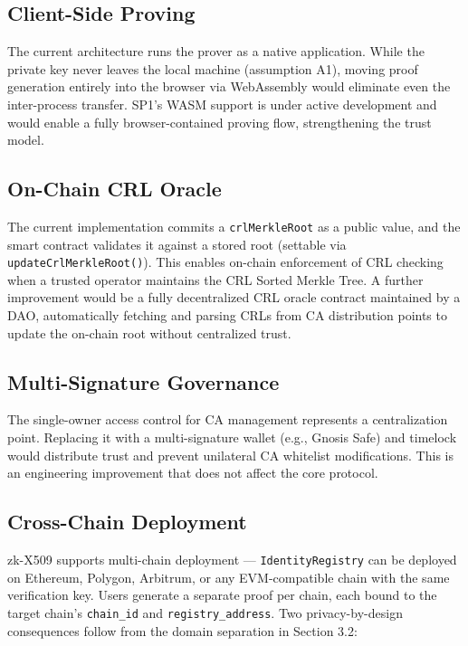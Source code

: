 \documentclass[11pt, a4paper]{article}
\begin{document}
\subsection{Client-Side Proving}\label{client-side-proving}

The current architecture runs the prover as a native application. While the
private key never leaves the local machine (assumption A1), moving proof
generation entirely into the browser via WebAssembly would eliminate
even the inter-process transfer. SP1's WASM support is under active
development and would enable a fully browser-contained proving flow,
strengthening the trust model.

\subsection{On-Chain CRL Oracle}\label{on-chain-crl-oracle}

The current implementation commits a \texttt{crlMerkleRoot} as a public
value, and the smart contract validates it against a stored root
(settable via \texttt{updateCrlMerkleRoot()}). This enables on-chain
enforcement of CRL checking when a trusted operator maintains the CRL
Sorted Merkle Tree. A further improvement would be a fully decentralized
CRL oracle contract maintained by a DAO, automatically fetching and
parsing CRLs from CA distribution points to update the on-chain root
without centralized trust.

\subsection{Multi-Signature
Governance}\label{multi-signature-governance}

The single-owner access control for CA management represents a
centralization point. Replacing it with a multi-signature wallet (e.g.,
Gnosis Safe) and timelock would distribute trust and prevent unilateral
CA whitelist modifications. This is an engineering improvement that does
not affect the core protocol.

\subsection{Cross-Chain Deployment}\label{cross-chain-deployment}

zk-X509 supports multi-chain deployment --- \texttt{IdentityRegistry}
can be deployed on Ethereum, Polygon, Arbitrum, or any EVM-compatible
chain with the same verification key. Users generate a separate proof
per chain, each bound to the target chain's \texttt{chain\_id} and
\texttt{registry\_address}. Two privacy-by-design consequences follow
from the domain separation in Section 3.2:
\end{document}
